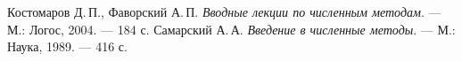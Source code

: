 \documentclass[a4paper, fleqn]{report}
\begin{document}
\begin{thebibliography}{2}
\renewcommand{\bibname}{Литература}
Костомаров Д.\,П., Фаворский А.\,П. \textit{Вводные лекции по численным методам}. — М.: Логос, 2004. — 184 с.
Самарский А.\,А. \textit{Введение в численные методы}. — М.: Наука, 1989. — 416 с.
\end{thebibliography}
\end{document}
